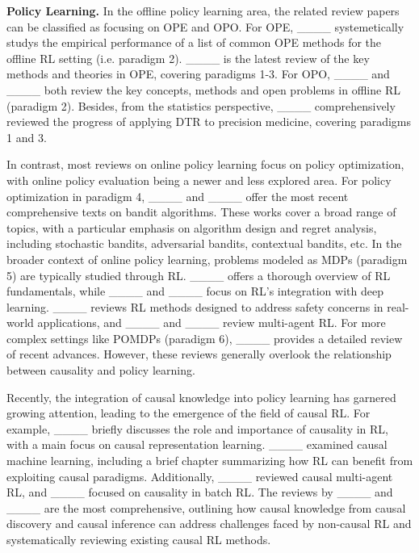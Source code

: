 \noindent 
\textbf{Policy Learning.} In the offline policy learning area, the related review papers can be classified as focusing on \acrfull{OPE} and \acrfull{OPO}.
For \acrshort{OPE}, 
____ systemetically studys the empirical performance of a list of common \acrshort{OPE} methods for the offline \acrfull{RL} setting (i.e. paradigm 2). 
____ is the latest review of the key methods and theories in \acrshort{OPE}, covering paradigms 1-3. For \acrshort{OPO}, ____ and  ____ both review the key concepts, methods and open problems in offline \acrshort{RL} (paradigm 2). Besides, from the statistics perspective, ____ comprehensively reviewed the progress of applying \acrshort{DTR} to precision medicine, covering paradigms 1 and 3. 

In contrast, most reviews on online policy learning focus on policy optimization, with online policy evaluation being a newer and less explored area. For policy optimization in paradigm 4, ____ and ____ offer the most recent comprehensive texts on bandit algorithms. These works cover a broad range of topics, with a particular emphasis on algorithm design and regret analysis, including stochastic bandits, adversarial bandits, contextual bandits, etc.  
In the broader context of online policy learning, problems modeled as \acrshort{MDP}s (paradigm 5) are typically studied through \acrshort{RL}. ____ offers a thorough overview of \acrshort{RL} fundamentals, while ____ and ____ focus on RL's integration with deep learning. ____ reviews \acrshort{RL} methods designed to address safety concerns in real-world applications, and ____ and ____ review multi-agent RL. For more complex settings like \acrshort{POMDP}s (paradigm 6), ____ provides a detailed review of recent advances. However, these reviews generally overlook the relationship between causality and policy learning.

Recently, the integration of causal knowledge into policy learning has garnered growing attention, leading to the emergence of the field of causal \acrshort{RL}. For example, ____ briefly discusses the role and importance of causality in \acrshort{RL}, with a main focus on causal representation learning. ____ examined causal machine learning, including a brief chapter summarizing how \acrshort{RL} can benefit from exploiting causal paradigms. Additionally, ____ reviewed causal multi-agent \acrshort{RL}, and ____ focused on causality in batch \acrshort{RL}. The reviews by ____ and ____ are the most comprehensive, outlining how causal knowledge from causal discovery and causal inference can address challenges faced by non-causal \acrshort{RL} and systematically reviewing existing causal \acrshort{RL} methods.

